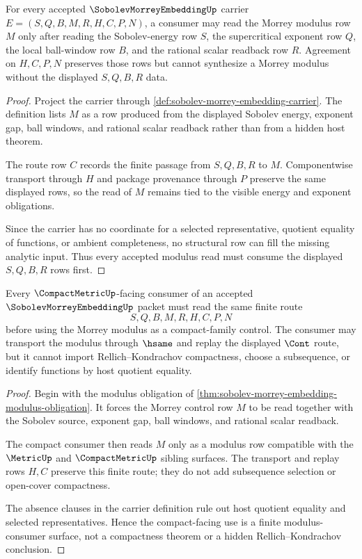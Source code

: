 \begin{theorem}
\label{thm:sobolev-morrey-embedding-modulus-obligation}
For every accepted $\SobolevMorreyEmbeddingUp$ carrier $E=(S,Q,B,M,R,H,C,P,N)$, a consumer may read the Morrey modulus row $M$ only after reading the Sobolev-energy row $S$, the supercritical exponent row $Q$, the local ball-window row $B$, and the rational scalar readback row $R$. Agreement on $H,C,P,N$ preserves those rows but cannot synthesize a Morrey modulus without the displayed $S,Q,B,R$ data.
\end{theorem}
\begin{proof}
Project the carrier through \autoref{def:sobolev-morrey-embedding-carrier}. The definition lists $M$ as a row produced from the displayed Sobolev energy, exponent gap, ball windows, and rational scalar readback rather than from a hidden host theorem.

The route row $C$ records the finite passage from $S,Q,B,R$ to $M$. Componentwise transport through $H$ and package provenance through $P$ preserve the same displayed rows, so the read of $M$ remains tied to the visible energy and exponent obligations.

Since the carrier has no coordinate for a selected representative, quotient equality of functions, or ambient completeness, no structural row can fill the missing analytic input. Thus every accepted modulus read must consume the displayed $S,Q,B,R$ rows first.
\end{proof}

\begin{theorem}
\label{thm:sobolev-morrey-embedding-compact-consumer}
Every $\CompactMetricUp$-facing consumer of an accepted $\SobolevMorreyEmbeddingUp$ packet must read the same finite route
$$
S,Q,B,M,R,H,C,P,N
$$
before using the Morrey modulus as a compact-family control. The consumer may transport the modulus through $\hsame$ and replay the displayed $\Cont$ route, but it cannot import Rellich--Kondrachov compactness, choose a subsequence, or identify functions by host quotient equality.
\end{theorem}
\begin{proof}
Begin with the modulus obligation of \autoref{thm:sobolev-morrey-embedding-modulus-obligation}. It forces the Morrey control row $M$ to be read together with the Sobolev source, exponent gap, ball windows, and rational scalar readback.

The compact consumer then reads $M$ only as a modulus row compatible with the $\MetricUp$ and $\CompactMetricUp$ sibling surfaces. The transport and replay rows $H,C$ preserve this finite route; they do not add subsequence selection or open-cover compactness.

The absence clauses in the carrier definition rule out host quotient equality and selected representatives. Hence the compact-facing use is a finite modulus-consumer surface, not a compactness theorem or a hidden Rellich--Kondrachov conclusion.
\end{proof}

